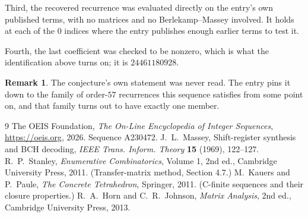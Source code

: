 \documentclass[11pt,a4paper]{article}
\theoremstyle{plain}
\theoremstyle{definition}
\newtheorem{remark}[theorem]{Remark}
\begin{document}
Third, the recovered recurrence was evaluated directly on the entry's own published terms, with
no matrices and no Berlekamp--Massey involved. It holds at each of the $0$ indices where
the entry publishes enough earlier terms to test it.

Fourth, the last coefficient was checked to be nonzero, which is what the identification above
turns on; it is $24461180928$.

\begin{remark}
The conjecture's own statement was never read. The entry pins it down to the family of
order-$57$ recurrences this sequence satisfies from some point on, and that family turns
out to have exactly one member.
\end{remark}

\begin{thebibliography}{9}
 The OEIS Foundation, \emph{The On-Line Encyclopedia of Integer
Sequences}, \url{https://oeis.org}, 2026. Sequence A230472.
 J.~L.~Massey, Shift-register synthesis and BCH decoding, \emph{IEEE
Trans. Inform. Theory} \textbf{15} (1969), 122--127.
 R.~P.~Stanley, \emph{Enumerative Combinatorics}, Volume 1, 2nd ed.,
Cambridge University Press, 2011. (Transfer-matrix method, Section 4.7.)
 M.~Kauers and P.~Paule, \emph{The Concrete Tetrahedron}, Springer, 2011.
(C-finite sequences and their closure properties.)
 R.~A.~Horn and C.~R.~Johnson, \emph{Matrix Analysis}, 2nd ed., Cambridge
University Press, 2013.
\end{thebibliography}
\end{document}
